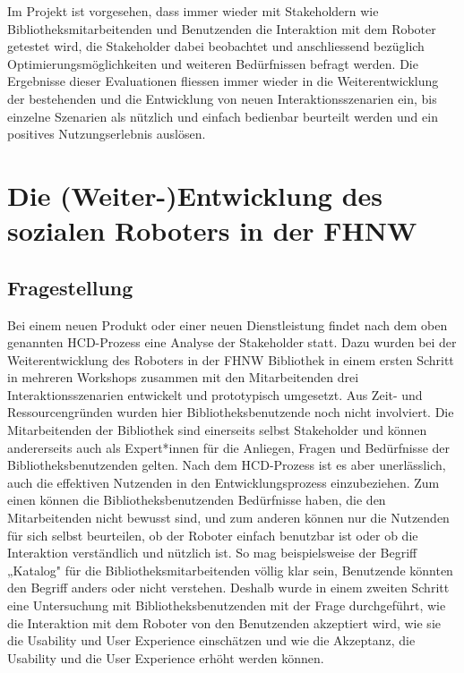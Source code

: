 \documentclass[a4paper,
fontsize=11pt,
oneside,
numbers=noperiodatend,
parskip=half-,
bibliography=totoc,
final
]{scrartcl}
\begin{document}
Im Projekt ist vorgesehen, dass immer wieder mit Stakeholdern wie
Bibliotheksmitarbeitenden und Benutzenden die Interaktion mit dem
Roboter getestet wird, die Stakeholder dabei beobachtet und
anschliessend bezüglich Optimierungsmöglichkeiten und weiteren
Bedürfnissen befragt werden. Die Ergebnisse dieser Evaluationen fliessen
immer wieder in die Weiterentwicklung der bestehenden und die
Entwicklung von neuen Interaktionsszenarien ein, bis einzelne Szenarien
als nützlich und einfach bedienbar beurteilt werden und ein positives
Nutzungserlebnis auslösen.

\hypertarget{die-weiter-entwicklung-des-sozialen-roboters-in-der-fhnw}{%
\section{Die (Weiter-)Entwicklung des sozialen Roboters in der
FHNW}\label{die-weiter-entwicklung-des-sozialen-roboters-in-der-fhnw}}

\hypertarget{fragestellung}{%
\subsection{Fragestellung}\label{fragestellung}}

Bei einem neuen Produkt oder einer neuen Dienstleistung findet nach dem
oben genannten HCD-Prozess eine Analyse der Stakeholder statt. Dazu
wurden bei der Weiterentwicklung des Roboters in der FHNW Bibliothek in
einem ersten Schritt in mehreren Workshops zusammen mit den
Mitarbeitenden drei Interaktionsszenarien entwickelt und prototypisch
umgesetzt. Aus Zeit- und Ressourcengründen wurden hier
Bibliotheksbenutzende noch nicht involviert. Die Mitarbeitenden der
Bibliothek sind einerseits selbst Stakeholder und können andererseits
auch als Expert*innen für die Anliegen, Fragen und Bedürfnisse der
Bibliotheksbenutzenden gelten. Nach dem HCD-Prozess ist es aber
unerlässlich, auch die effektiven Nutzenden in den Entwicklungsprozess
einzubeziehen. Zum einen können die Bibliotheksbenutzenden Bedürfnisse
haben, die den Mitarbeitenden nicht bewusst sind, und zum anderen können
nur die Nutzenden für sich selbst beurteilen, ob der Roboter einfach
benutzbar ist oder ob die Interaktion verständlich und nützlich ist. So
mag beispielsweise der Begriff „Katalog" für die
Bibliotheksmitarbeitenden völlig klar sein, Benutzende könnten den
Begriff anders oder nicht verstehen. Deshalb wurde in einem zweiten
Schritt eine Untersuchung mit Bibliotheksbenutzenden mit der Frage
durchgeführt, wie die Interaktion mit dem Roboter von den Benutzenden
akzeptiert wird, wie sie die Usability und User Experience einschätzen
und wie die Akzeptanz, die Usability und die User Experience erhöht
werden können.
\end{document}
